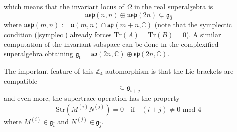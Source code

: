 \documentclass[a4paper,12pt]{article}
\numberwithin{equation}{section}
\numberwithin{thm}{section}
\numberwithin{exm}{section}
\newcommand{\tr}{\mathrm{Tr}}
\newcommand{\str}{\mathrm{Str}}
\newcommand{\Z}{{\mathbb Z}}
\newcommand{\C}{{\mathbb C}}
\newcommand{\<}{{\langle}}
\renewcommand{\>}{{\rangle}}
\newcommand{\mf}{\mathfrak}
\newcommand{\Om}{{\Omega}}
\begin{document}
which means that the invariant locus \cite{Berkovits2000} of $\Om$ in the real superalgebra is
	\begin{equation}
	\mf{usp}(n,n)\oplus\mf{usp}(2n) \varsubsetneq \mf{g}_{\bar 0}
	\end{equation}
where $\mf{usp}(m,n) := \mf{u}(m,n)\cap\mf{sp}(m+n,\C)$ (note that the symplectic condition (\ref{symplec}) already forces $\tr(A) =\tr(B) = 0$). A similar computation of the invariant subspace can be done in the complexified superalgebra obtaining $\mf{g}_{\bar 0} = \mf{sp}(2n,\C)\oplus \mf{sp}(2n,\C)$.

The important feature of this $\Z_4$-automorphism is that the Lie brackets are compatible
	\begin{equation}
	[\mf g_{\bar i}, \mf g_{\bar j}] \subset \mf g_{\bar i + \bar j}
	\end{equation}
and even more, the supertrace operation has the property
	\begin{equation}
	\str (M^{(i)} N^{(j)}) = 0 \quad\text{if}\quad (i+j)\neq 0 \text{ mod } 4
	\end{equation}
where $M^{(i)}\in \mf g_{\bar i}$ and $N^{(j)}\in \mf g_{\bar j}$.
\end{document}
